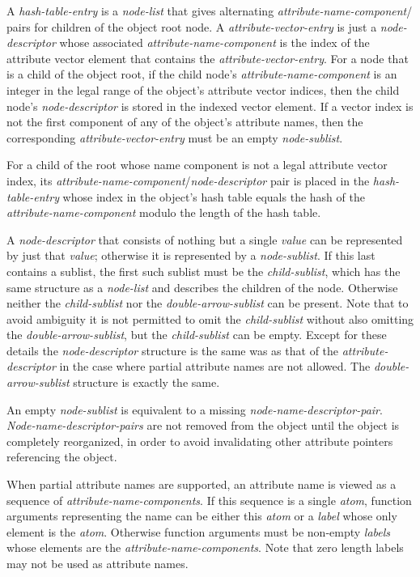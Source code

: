 \documentclass[12pt]{article}
\newcommand{\EOL}{\penalty \exhyphenpenalty}
\begin{document}
A {\em hash-table-entry} is a {\em node-list} that gives alternating
{\em attribute-name-component}/\EOL {\em node-\EOL de\-scrip\-tor} pairs for
children of the object root node.  A {\em attribute-vector-entry}
is just a {\em node-descriptor} whose associated {\em attribute-name-component}
is the index of the attribute vector element that contains the
{\em attribute-vector-entry}.
For a node that is a child of the object root,
if the child node's {\em attribute-name-component} is an integer in the legal
range of the object's attribute vector indices, then the child node's
{\em node-descriptor} is stored in
the indexed vector element.
If a vector index is not the first component of
any of the object's attribute names, then the corresponding
{\em attribute-vector-entry} must be an empty {\em node-sublist}.

For a child of the root whose name component is not a legal attribute
vector index, its {\em attribute-name-component}/{\em node-descriptor}
pair is placed in the {\em hash-table-entry}
whose index in the object's hash table equals the hash of the
{\em attribute-name-component} modulo the length of the hash table.

A {\em node-descriptor} that consists of nothing but a single {\em value}
can be represented by just that {\em value}; otherwise it is represented
by a {\em node-sublist}.  If this last contains a sublist, the first
such sublist must
be the {\em child-sublist}, which has the same structure as a {\em node-list}
and describes the children of the node.  Otherwise neither the
{\em child-sublist} nor the {\em double-arrow-sublist} can be present.
Note that to avoid ambiguity it is not permitted to omit the
{\em child-sublist} without also omitting
the {\em double-arrow-sublist}, but the
{\em child-sublist} can be empty.  Except for these details
the {\em node-descriptor} structure is the same was as that of the
{\em attribute-descriptor} in the case where partial attribute names are
not allowed.  The {\em double-arrow-sublist} structure is exactly
the same.

An empty {\em node-sublist} is equivalent to a missing
{\em node-name-descriptor-pair}.
{\em Node-name-descriptor-pairs} are not
removed from the object until the object is completely reorganized,
in order to avoid invalidating other attribute pointers referencing the object.

When partial attribute names are supported, an attribute name is viewed
as a sequence of {\em attribute-name-components}.  If this sequence is
a single {\em atom}, function arguments representing the name can be
either this {\em atom} or a {\em label} whose only element is the {\em atom}.
Otherwise function arguments must be non-empty
{\em labels} whose elements are the {\em attribute-name-components}.
Note that zero length labels may not be used as attribute names.
\end{document}
